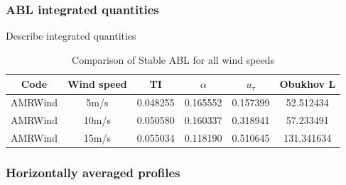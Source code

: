 \subsubsection{ABL integrated quantities}
Describe integrated quantities

\begin{table}
\caption{\label{tab:CompareAMRallWS} Comparison of Stable ABL for all
  wind speeds} \centering
\begin{tabular}{cccccc}
  \hline
  Code & Wind speed & TI      &  $\alpha$  &   $u_\tau$  &  Obukhov  L \\
  \hline
  AMRWind & 5m/s      & 0.048255 &  0.165552 &  0.157399  & 52.512434 \\
  AMRWind & 10m/s     & 0.050580 &  0.160337 &  0.318941  &  57.233491 \\
  AMRWind & 15m/s     & 0.055034 &  0.118190 &  0.510645  & 131.341634 \\
  \hline
\end{tabular}
\end{table}

\subsubsection{Horizontally averaged profiles}

